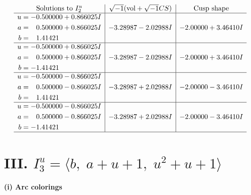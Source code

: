 \documentclass[1p]{elsarticle_modified}
\theoremstyle{definition}
\newcommand{\I}{\sqrt{-1}}
\begin{document}
$$\begin{array}{c|c|c}  
\text{Solutions to }I^u_{2}& \I (\text{vol} + \sqrt{-1}CS) & \text{Cusp shape}\\
 \hline 
\begin{aligned}
u &= -0.500000 + 0.866025 I \\
a &= \phantom{-}0.500000 + 0.866025 I \\
b &= \phantom{-}1.41421\phantom{ +0.000000I}\end{aligned}
 & -3.28987 - 2.02988 I & -2.00000 + 3.46410 I \\ \hline\begin{aligned}
u &= -0.500000 + 0.866025 I \\
a &= \phantom{-}0.500000 + 0.866025 I \\
b &= -1.41421\phantom{ +0.000000I}\end{aligned}
 & -3.28987 - 2.02988 I & -2.00000 + 3.46410 I \\ \hline\begin{aligned}
u &= -0.500000 - 0.866025 I \\
a &= \phantom{-}0.500000 - 0.866025 I \\
b &= \phantom{-}1.41421\phantom{ +0.000000I}\end{aligned}
 & -3.28987 + 2.02988 I & -2.00000 - 3.46410 I \\ \hline\begin{aligned}
u &= -0.500000 - 0.866025 I \\
a &= \phantom{-}0.500000 - 0.866025 I \\
b &= -1.41421\phantom{ +0.000000I}\end{aligned}
 & -3.28987 + 2.02988 I & -2.00000 - 3.46410 I\\
 \hline 
 \end{array}$$\newpage\newpage\renewcommand{\arraystretch}{1}
\centering \section*{III. $I^u_{3}= \langle b,\;a+u+1,\;u^2+u+1 \rangle$}
\flushleft \textbf{(i) Arc colorings}\\
\end{document}

